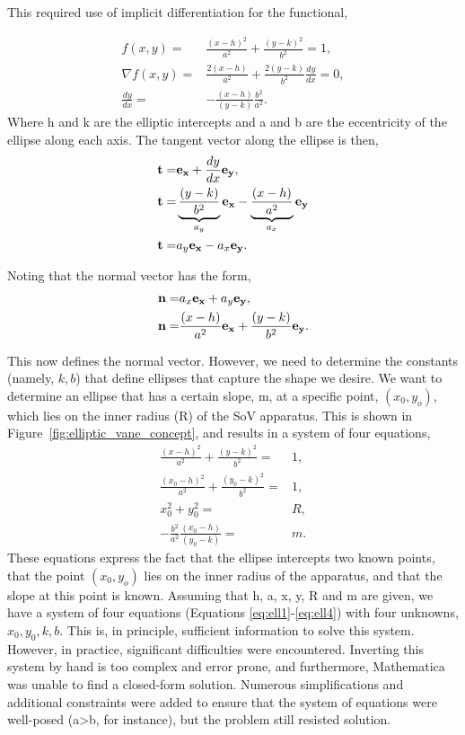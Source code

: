 This required use of implicit differentiation for the functional,

\begin{eqnarray}
 f(x,y)  =& \frac{(x-h)^2}{a^2} + \frac{(y-k)^2}{b^2} = 1, \\
 \nabla f(x,y) =& \frac{2 (x-h)}{a^2} + \frac{2 (y-k)}{b^2}\frac{dy}{dx} = 0, \\
 \frac{dy}{dx} =& -\frac{(x-h)}{(y-k)}\frac{b^2}{a^2}. 
\end{eqnarray}
Where h and k are the elliptic intercepts and a and b are the
eccentricity of the ellipse along each axis. The tangent vector along
the ellipse is then,  
\begin{eqnarray}
 {\bf t} =& {\bf e_x} + \frac{dy}{dx}{\bf e_y}, \\
 {\bf t} =& \underbrace{\frac{(y-k)}{b^2}}_{a_y} {\bf e_x} -
  \underbrace{\frac{(x-h)}{a^2}}_{a_x}{\bf e_y} \\
 {\bf t} =& {a_y} {\bf e_x} - {a_x}{\bf e_y}. 
\end{eqnarray}

Noting that the normal vector has the form, 
\begin{eqnarray}
 {\bf n} =& {a_x} {\bf e_x} + {a_y}{\bf e_y}, \label{eqn:a_x}\\
 {\bf n} =& \frac{(x-h)}{a^2} {\bf e_x} + \frac{(y-k)}{b^2} {\bf e_y}.
\end{eqnarray}

This now defines the normal vector. However, we need to determine the 
constants (namely, $k,b$) that define ellipses that capture the shape we
desire. We want to determine an ellipse that has a certain
slope, m, at a specific point,  $(x_0,y_o)$, which lies on the inner
radius (R) of the SoV apparatus. This is shown in
Figure~\ref{fig:elliptic_vane_concept}, and results in a system of four
equations,
\begin{eqnarray}
 \frac{(x-h)^2}{a^2} + \frac{(y-k)^2}{b^2} =& 1, \label{eq:ell1}\\
 \frac{(x_0-h)^2}{a^2} + \frac{(y_0-k)^2}{b^2} =& 1, \label{eq:ell2}  \\
 x_0^2 + y_0^2 =& R, \label{eq:ell3} \\
 -\frac{b^2}{a^2}\frac{(x_0-h)}{(y_0-k)} =& m. \label{eq:ell4} 
\end{eqnarray}
These equations express the fact that the ellipse intercepts two known
points, that the point $(x_0,y_o)$ lies on the inner radius of the
apparatus, and that the slope at this point is known. Assuming that
h, a, x, y, R and m are given, we have a system of four equations
(Equations \ref{eq:ell1}-\ref{eq:ell4}) with four unknowns,
$x_0,y_0,k,b$. This is, in principle, sufficient information to solve
this system. However, in practice, significant difficulties were
encountered. Inverting this system by hand is too complex and error
prone, and furthermore, Mathematica was unable to find a closed-form
solution. Numerous simplifications and additional constraints were added
to ensure that the system of equations were well-posed (a>b, for
instance), but the problem still resisted solution.

